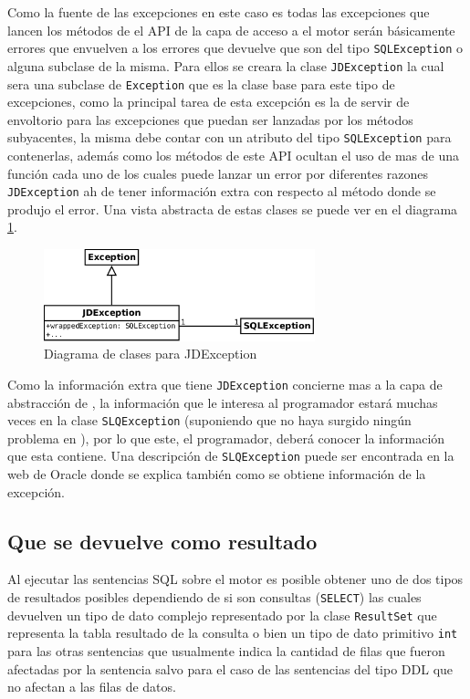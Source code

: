 Como la fuente de las excepciones en este caso es \jd todas las excepciones que lancen los métodos de el API de la capa de acceso a el motor serán básicamente errores que envuelven a los  errores que devuelve \jd que son del tipo \verb=SQLException= o alguna subclase de la misma. Para ellos se creara la clase \verb=JDException= la cual sera una subclase de \verb=Exception= que es la clase base para este tipo de excepciones, como la principal tarea de esta excepción es la de servir de envoltorio para las excepciones que puedan ser lanzadas por los métodos subyacentes, la misma debe contar con un atributo del tipo \verb=SQLException= para contenerlas, además como los métodos de este API ocultan el uso de mas de una función cada uno de los cuales puede lanzar un error por diferentes razones \verb=JDException= ah de tener información extra con respecto al método donde se produjo el error. Una vista abstracta de estas clases se puede ver en el diagrama \ref{fig:jdbgm-exception}.
%
\begin{figure}[h]
  \centering
    \includegraphics[width=0.7\textwidth]{figuras/jdbgm-exception.png}
  \caption{Diagrama de clases para JDException}
  \label{fig:jdbgm-exception}
\end{figure}

Como la información extra que tiene \verb=JDException= concierne mas a la capa de abstracción de \jj, la información que le interesa al programador estará muchas veces en la clase \verb=SLQException= (suponiendo que no haya surgido ningún problema en \jj), por lo que este, el programador, deberá conocer la información que esta contiene. Una descripción de \verb=SLQException= puede ser encontrada en la web de Oracle\citep{java:exeptions} donde se explica también como se obtiene información de la excepción.
%
\subsection{Que se devuelve como resultado}
Al ejecutar las sentencias SQL sobre el motor es posible obtener uno de dos tipos de resultados posibles dependiendo de si son consultas (\verb=SELECT=) las cuales devuelven un tipo de dato complejo representado por la clase \verb=ResultSet= que representa la tabla resultado de la consulta o bien un tipo de dato primitivo \verb=int= para las otras sentencias que usualmente indica la cantidad de filas que fueron afectadas por la sentencia salvo para el caso de las sentencias del tipo DDL que no afectan a las filas de datos.

